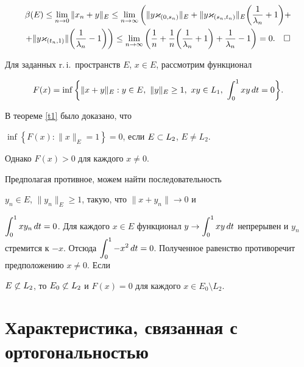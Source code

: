 \begin{multline*}


\beta(E) \le \liml{n \to 0} \|x_n+y\|_E \le \liml{n\to \infty} 


\bigg( \|y\varkappa_{(0,s_n)}\|_E + 


\|y \varkappa_{(s_n, t_n)}\|_E \bigg( \frac 1 {\lambda_n} +1 \bigg) +  \\


%


+ \|y \varkappa_{(t_n, 1)}\|\bigg(\frac 1 {\lambda_n} - 1\bigg) \bigg) \le


\liml{n\to \infty} \bigg(\frac 1 n +


\frac 1 n \bigg( \frac 1 {\lambda_n} + 1\bigg) + 


\frac 1 {\lambda_n} - 1\bigg) =0. \quad\square


\end{multline*}





Для заданных r.\,i.\ пространств $E$, $x\in E$, рассмотрим функционал


$$


F(x)= \inf\bigg\{ \|x+y\|_E: y\in E, \ \|y\|_E \ge 1, \ xy \in L_1, \ 


\intl{0}{1} xy\, dt =0\bigg\}.


$$


В теореме \ref{t1} было доказано, что


$\inf\left\{ F(x): \|x\|_E =1\right\} =0$, если $E\subset L_2$, $E\ne L_2$. 


Однако $F(x) >0$ для каждого $x\ne 0$.


Предполагая противное, можем найти последовательность


$y_n \in E$, $\|y_n\|_E {\ge} 1$, такую, что $\|x+y_n\|\to 0$ и


$\intl{0}{1} xy_n\, dt =0$. Для каждого $x\in E$ функционал $y\to \intl{0}{1}


xy\, dt$ непрерывен и $y_n$ стремится к $-x$. Отсюда $\intl{0}{1}-x^2 \, dt 


=0$. Полученное равенство противоречит предположению $x\ne 0$. Если


$E \not \sus L_2$, то $E_0 \not \sus L_2$ и $F(x) =0$ для каждого $x\in 


E_0 \setminus L_2$.








\section{Характеристика, связанная с ортогональностью}





